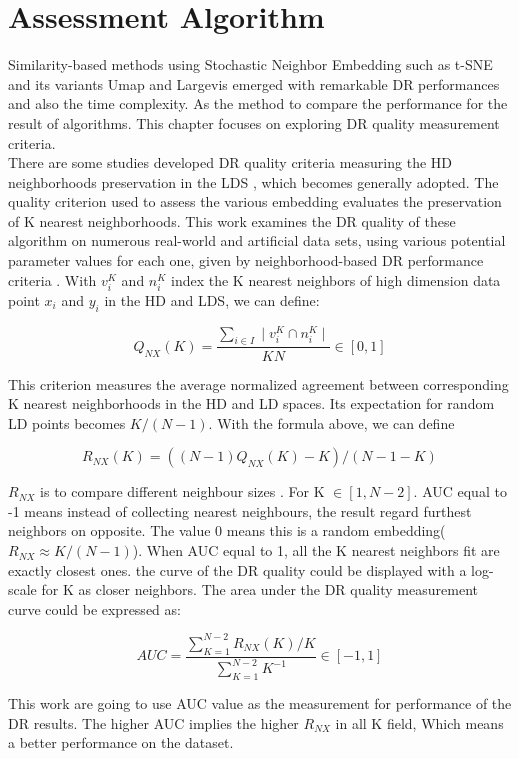 \chapter{Assessment Algorithm}

Similarity-based methods using Stochastic Neighbor Embedding such as t-SNE and its variants Umap and Largevis emerged with remarkable DR performances and also the time complexity. As the method to compare the performance for the result of algorithms. This chapter focuses on exploring DR quality measurement criteria. \\

\noindent There are some studies developed DR quality criteria measuring the HD neighborhoods preservation in the LDS \cite{ref10}, which becomes generally adopted. The quality criterion used to assess the various embedding evaluates the preservation of K nearest neighborhoods\cite{ref4}. This work examines the DR quality of these algorithm on numerous real-world and artificial data sets\cite{ref8}, using various potential parameter values for each one, given by neighborhood-based DR performance criteria \cite{ref9}. With $v^K_i$ and $n^K_i$ index the K nearest neighbors of high dimension data point $x_i$ and $y_i$ in the HD and LDS, we can define:

\begin{equation*}
    Q_{NX} (K) = \frac{ \sum_{i \in I} \mid v^K_i \cap n^K_i \mid }{ KN}  \in [0,1]
\end{equation*}

\noindent This criterion measures the average normalized agreement between corresponding K nearest neighborhoods in the HD and LD spaces\cite{ref18}. Its expectation for random LD points becomes $K/ (N − 1)$. With the formula above, we can define

\begin{equation*}
    R_{NX} (K) = ((N − 1)Q_{NX} (K) − K) /(N − 1 − K)
\end{equation*}

\noindent $R_{NX}$ is to compare different neighbour sizes \cite{ref11}. For K $\in [1, N-2]$. AUC equal to -1 means instead of collecting nearest neighbours, the result regard furthest neighbors on opposite. The value 0 means this is a random embedding($R_{NX} \approx K/(N-1)$)\cite{ref4}. When AUC equal to 1, all the K nearest neighbors fit are exactly closest ones. the curve of the DR quality could be displayed with a log-scale for K as closer neighbors. The area under the DR quality measurement curve could be expressed as:

\begin{equation*}
    AUC  = \frac{ \sum_{K=1}^{N-2} R_{NX}(K)/K}{\sum_{K=1}^{N-2}K^{-1}}   \in [-1,1]
\end{equation*}

\noindent This work are going to use AUC value as the measurement for performance of the DR results. The higher AUC implies the higher $R_{NX}$ in all K field, Which means a better performance on the dataset.